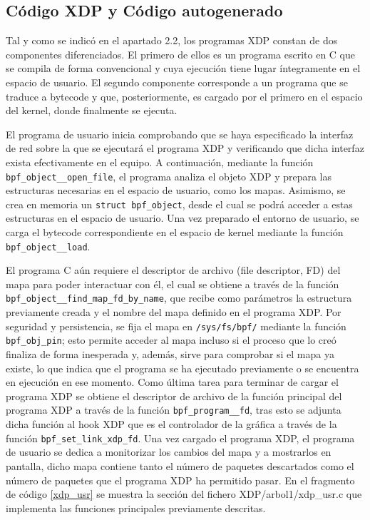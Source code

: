 \subsection{Código XDP y Código autogenerado}

Tal y como se indicó en el apartado 2.2, los programas XDP constan de dos componentes diferenciados. El primero de ellos es un programa escrito en C que se compila de forma convencional y cuya ejecución tiene lugar íntegramente en el espacio de usuario. El segundo componente corresponde a un programa que se traduce a bytecode y que, posteriormente, es cargado por el primero en el espacio del kernel, donde finalmente se ejecuta.

El programa de usuario inicia comprobando que se haya especificado la interfaz de red sobre la que se ejecutará el programa XDP y verificando que dicha interfaz exista efectivamente en el equipo. A continuación, mediante la función \verb|bpf_object__open_file|, el programa analiza el objeto XDP y prepara las estructuras necesarias en el espacio de usuario, como los mapas. Asimismo, se crea en memoria un \verb|struct bpf_object|, desde el cual se podrá acceder a estas estructuras en el espacio de usuario. Una vez preparado el entorno de usuario, se carga el bytecode correspondiente en el espacio de kernel mediante la función \verb|bpf_object__load|.

El programa C aún requiere el descriptor de archivo (file descriptor, FD) del mapa para poder interactuar con él, el cual se obtiene a través de la función \verb|bpf_object__find_map_fd_by_name|, que recibe como parámetros la estructura previamente creada y el nombre del mapa definido en el programa XDP. Por seguridad y persistencia, se fija el mapa en \verb|/sys/fs/bpf/| mediante la función \verb|bpf_obj_pin|; esto permite acceder al mapa incluso si el proceso que lo creó finaliza de forma inesperada y, además, sirve para comprobar si el mapa ya existe, lo que indica que el programa se ha ejecutado previamente o se encuentra en ejecución en ese momento. Como última tarea para terminar de cargar el programa XDP se obtiene el descriptor de archivo de la función principal del programa XDP a través de la función \verb|bpf_program__fd|, tras esto se adjunta dicha función al hook XDP que es el controlador de la gráfica a través de la función \verb|bpf_set_link_xdp_fd|. Una vez cargado el programa XDP, el programa de usuario se dedica a monitorizar los cambios del mapa y a mostrarlos en pantalla, dicho mapa contiene tanto el número de paquetes descartados como el número de paquetes que el programa XDP ha permitido pasar. En el fragmento de código \ref{xdp_usr} se muestra la sección del fichero XDP/arbol1/xdp\_usr.c que implementa las funciones principales previamente descritas.

